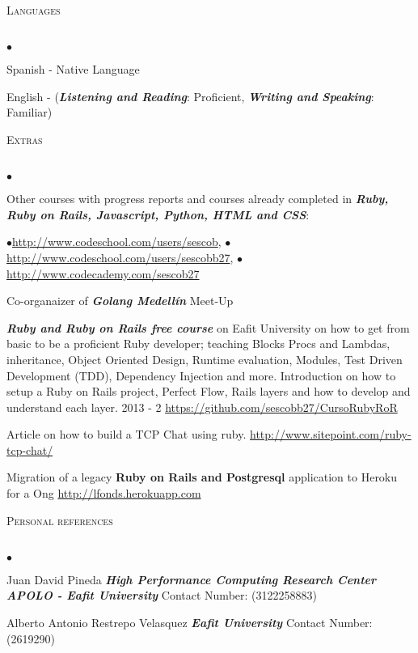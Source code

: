 \documentclass[a4paper]{article}
\newcommand{\lineunder}{\vspace*{-8pt} \\ \hspace*{-18pt} \hrulefill \\}
\newcommand{\header}[1]{{\hspace*{-15pt}\vspace*{6pt}
\textsc{#1}} \vspace*{-6pt} \lineunder}
\newenvironment{achievements}{\begin{list}{$\bullet$}{\topsep 0pt \itemsep
-2pt}}{\vspace*{4pt}\end{list}}
\newcommand{\programming}[1]{{\textbf{#1}}}
\newcommand{\emphasys}[1]{\textbf{\emph{#1}}}
\begin{document}
\header{Languages}
\begin{achievements}
\item{Spanish - Native Language}
\item{English - (\emphasys{Listening and Reading}: Proficient, \emphasys{Writing and Speaking}: Familiar)}
\end{achievements}
\header{Extras}
\begin{achievements}
\item{Other courses with progress reports and courses already completed in \emphasys{Ruby, Ruby on Rails, Javascript, Python, HTML and CSS}:}\\
\begin{center}
$\bullet$\url{http://www.codeschool.com/users/sescob},
$\bullet$\url{http://www.codeschool.com/users/sescobb27},
$\bullet$\url{http://www.codecademy.com/sescob27}
\end{center}
\item{Co-organaizer of \emphasys{Golang Medell\'in} Meet-Up}
\item{\emphasys{Ruby and Ruby on Rails free course} on Eafit University on how to get from basic to be a proficient Ruby developer; teaching Blocks Procs and Lambdas, inheritance, Object Oriented Design, Runtime evaluation, Modules, Test Driven Development (TDD), Dependency Injection and more. Introduction on how to setup a Ruby on Rails project, Perfect Flow, Rails layers and how to develop and understand each layer. 2013 - 2 \url{https://github.com/sescobb27/CursoRubyRoR}}
\item{Article on how to build a TCP Chat using ruby. \url{http://www.sitepoint.com/ruby-tcp-chat/}}
\item{Migration of a legacy \programming{Ruby on Rails and Postgresql} application to Heroku for a Ong \url{http://lfonds.herokuapp.com}}
\end{achievements}
\header{Personal references}
\begin{achievements}
\item{Juan David Pineda \emphasys{High Performance Computing Research Center APOLO - Eafit University} Contact Number: (3122258883)}
\item{Alberto Antonio Restrepo Velasquez  \emphasys{Eafit University} Contact Number: (2619290)}
\end{achievements}
\end{document}
